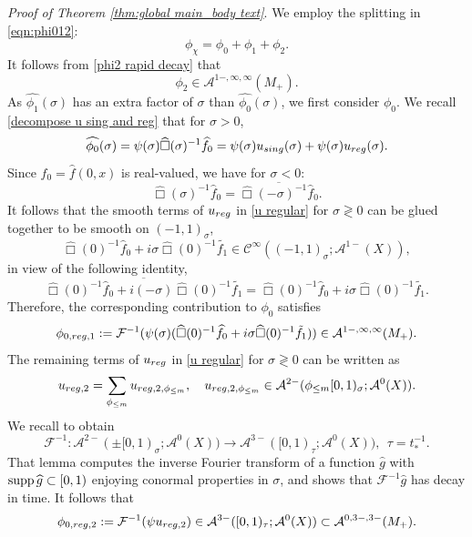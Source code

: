 \documentclass[10pt,a4paper,reqno]{amsart}
\newcommand{\CI}{\mathcal{C}^\infty}
\newcommand{\A}{\mathcal{A}}
\newcommand{\ti}{\tilde}
\newcommand{\supp}{\text{supp\,}}
\let\pminus\pm
\let\hat\widehat
\renewcommand{\pm}{\phi_{\le m}}
\theoremstyle{definition}
\theoremstyle{remark}
\numberwithin{equation}{section}
\newcommand{\wh}{\widehat}
\begin{document}
\bigskip
\noindent
{\textit{Proof of Theorem \ref{thm:global main_body text}}.} We employ the splitting in \eqref{eqn:phi012}:
\[
    \phi_\chi = \phi_0 + \phi_1 + \phi_2.
\]
It follows from \eqref{phi2 rapid decay} that
\begin{equation}
\label{phi2 in conormal M+}
    \phi_2 \in \A^{1-,\infty,\infty}(M_+).
\end{equation}
As $\widehat{\phi_1}(\sigma)$ has an extra factor of $\sigma$ than $\widehat{\phi_0}(\sigma)$, we first consider $\phi_0$. We recall \eqref{decompose u sing and reg} that for $\sigma>0$,
\[
    \wh{\phi_0}(\sigma) = \psi(\sigma)\wh\Box(\sigma)^{-1}\wh{f}_0 = \psi(\sigma)u_{\rm{sing}}(\sigma) + \psi(\sigma)u_{\rm{reg}}(\sigma).
\]
Since $\wh{f}_0=\wh{f}(0,x)$ is real-valued, we have for $\sigma<0$:
\begin{equation}
\label{resolvent negative sigma}
    \wh\Box(\sigma)^{-1}\wh{f}_0 = \overline{\wh\Box(-\sigma)^{-1}\wh{f}_0}.
\end{equation}
It follows that the smooth terms of $u_{\rm{reg}}$ in \eqref{u regular} for $\sigma \gtrless 0$ can be glued together to be smooth on $(-1,1)_\sigma$,
\[
    \wh\Box(0)^{-1} \wh{f}_0 + i\sigma \wh\Box(0)^{-1}\ti{f_1} \in\CI ((-1,1)_\sigma; \A^{1-}(X)),
\]
in view of the following identity,
\[
	\overline{\wh\Box(0)^{-1} \wh{f}_0 + i(-\sigma)\wh\Box(0)^{-1}\ti{f_1}} = \wh\Box(0)^{-1} \wh{f}_0 + i\sigma \wh\Box(0)^{-1}\ti{f_1}.
\]
Therefore, the corresponding contribution to $\phi_0$ satisfies
\begin{equation}
\label{phi0 reg 1}
    \phi_{0,\rm{reg},1} := \mathcal{F}^{-1} (\psi(\sigma)(\wh\Box(0)^{-1} \wh{f}_0 + i\sigma \wh\Box(0)^{-1}\ti{f_1})) \in \A^{1-,\infty,\infty}(M_+).
\end{equation}
The remaining terms of $u_{\rm{reg}}$ in \eqref{u regular} for $\sigma\gtrless 0$ can be written as
\[
    u_{\rm{reg},2} = \sum_{\pminus} u_{\rm{reg},2,\pminus}, \quad u_{\rm{reg},2,\pminus} \in \A^{2-} (\pminus[0,1)_\sigma ; \A^0(X)).
\]
We recall \cite[Lemma 3.6]{Hin22} to obtain 
\begin{equation}
\label{IFT conormal}
    \mathcal{F}^{-1} : \A^{2-} (\pminus[0,1)_\sigma ; \A^0(X)) \to \A^{3-}([0,1)_\tau;\A^0(X)), \ \ \tau = t_*^{-1}.
\end{equation}
That lemma computes the inverse Fourier transform of a function $\hat g$ with $\supp \hat g \subset [0,1)$ enjoying conormal properties in $\sigma$, and shows that $\mathcal{F}^{-1} \hat g$ has decay in time. It follows that
\begin{equation}
\label{phi0 reg 2}
    \phi_{0,\rm{reg},2} := \mathcal{F}^{-1}(\psi u_{\rm{reg},2}) \in \A^{3-}([0,1)_\tau;\A^0(X)) \subset \A^{0,3-,3-}(M_+).
\end{equation}
\end{document}
